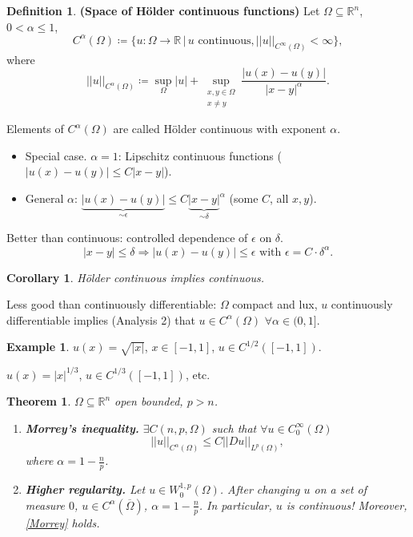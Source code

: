 \documentclass[12pt]{article}
\newtheorem{theorem}{Theorem}[section]
\newtheorem{corollary}{Corollary}[section]
\theoremstyle{definition}
\newtheorem*{definition*}{Definition}
\newtheorem*{example*}{Example}
\begin{document}
\begin{definition*}
\textbf{(Space of H\"older continuous functions)} Let $\Omega\subseteq\mathbb R^n$, $0<\alpha\leq1$,
\[C^\alpha(\Omega)\coloneqq\{u:\Omega\rightarrow\mathbb R\,|\,u\text{ continuous},||u||_{C^\infty(\Omega)}<\infty\},\]
where
\[||u||_{C^\alpha(\Omega)}\coloneqq\sup_\Omega|u|+\sup_{\substack{x,y\in\Omega\\x\neq y}}\frac{\big|u(x)-u(y)\big|}{|x-y|^\alpha}.\]

Elements of $C^\alpha(\Omega)$ are called H\"older continuous with exponent $\alpha$.

\begin{itemize}
\item Special case. $\alpha=1$: Lipschitz continuous functions ($|u(x)-u(y)|\leq C|x-y|$).

\item General $\alpha$: $\underbrace{|u(x)-u(y)|}_{\sim\epsilon}\leq C{\underbrace{|x-y|}_{\sim\delta}}^\alpha$ (some $C$, all $x,y$).
\end{itemize}
\end{definition*}

Better than continuous: controlled dependence of $\epsilon$ on $\delta$.
\[|x-y|\leq\delta\Rightarrow\big|u(x)-u(y)\big|\leq\epsilon\text{ with }\epsilon=C\cdot\delta^\alpha.\]

\begin{corollary}
H\"older continuous implies continuous.
\end{corollary}

Less good than continuously differentiable: $\Omega$ compact and lux, $u$ continuously differentiable implies (Analysis 2) that $u\in C^\alpha(\Omega)$ $\forall\alpha\in(0,1]$.

\begin{example*}
$u(x)=\sqrt{|x|}$, $x\in[-1,1]$, $u\in C^{1/2}([-1,1])$.

$u(x)=|x|^{1/3}$, $u\in C^{1/3}([-1,1])$, etc.
\end{example*}

\begin{theorem}\label{Morrey_higher_regularity}
$\Omega\subseteq\mathbb R^n$ open bounded, $p>n$.

\begin{enumerate}[label=\alph*)]
\item \textbf{Morrey's inequality.} $\exists C(n,p,\Omega)$ such that $\forall u\in C_0^\infty(\Omega)$
\begin{equation}\tag{M}\label{Morrey}
||u||_{C^\alpha(\Omega)}\leq C||Du||_{L^p(\Omega)},
\end{equation}
where $\alpha=1-\frac np$.

\item\label{higher_regularity} \textbf{Higher regularity.} Let $u\in W_0^{1,p}(\Omega)$. After changing $u$ on a set of measure $0$, $u\in C^\alpha(\overline\Omega)$, $\alpha=1-\frac np$. In particular, $u$ is continuous! Moreover, \eqref{Morrey} holds.
\end{enumerate}
\end{theorem}
\end{document}

